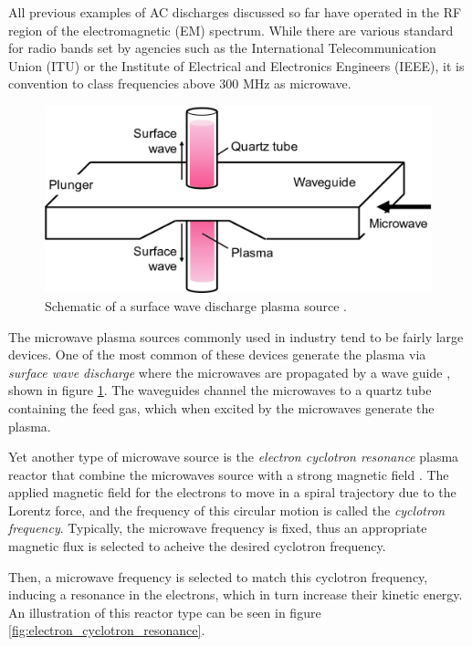 All previous examples of AC discharges discussed so far have operated in the RF region of the electromagnetic (EM) spectrum. While there are various standard for radio bands set by agencies such as the International Telecommunication Union (ITU) or the Institute of Electrical and Electronics Engineers (IEEE), it is convention to class frequencies above 300 MHz as microwave. 

\begin{figure}[h!]
	\centering
	\includegraphics[width=0.7\linewidth]{chapter_2/figures/surface_wave_discharge.png}
	\caption{Schematic of a surface wave discharge plasma source \cite{Toyoda2020}.}
	\label{fig:surface_wave_discharge}
\end{figure} 

The microwave plasma sources commonly used in industry tend to be fairly large devices. One of the most common of these devices generate the plasma via \textit{surface wave discharge} where the microwaves are propagated by a wave guide \cite{Toyoda2020}, shown in figure \ref{fig:surface_wave_discharge}. The waveguides channel the microwaves to a quartz tube containing the feed gas, which when excited by the microwaves generate the plasma.  

Yet another type of microwave source is the \textit{electron cyclotron resonance} plasma reactor that combine the microwaves source with a strong magnetic field \cite{Toyoda2020}. The applied magnetic field for the electrons to move in a spiral trajectory due to the Lorentz force, and the frequency of this circular motion is called the \textit{cyclotron frequency}. Typically, the microwave frequency is fixed, thus an appropriate magnetic flux is selected to acheive the desired cyclotron frequency.

Then, a microwave frequency is selected to match this cyclotron frequency, inducing a resonance in the electrons, which in turn increase their kinetic energy. An illustration of this reactor type can be seen in figure \ref{fig:electron_cyclotron_resonance}. 

